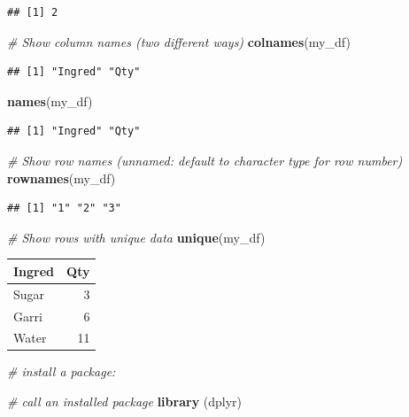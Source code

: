 \documentclass[
]{article}
\newenvironment{Shaded}{\begin{snugshade}}{\end{snugshade}}
\newcommand{\CommentTok}[1]{\textcolor[rgb]{0.56,0.35,0.01}{\textit{#1}}}
\newcommand{\FunctionTok}[1]{\textcolor[rgb]{0.13,0.29,0.53}{\textbf{#1}}}
\newcommand{\NormalTok}[1]{#1}
\begin{document}
\begin{verbatim}
## [1] 2
\end{verbatim}

\begin{Shaded}
\begin{Highlighting}[]
\CommentTok{\# Show column names (two different ways)}
\FunctionTok{colnames}\NormalTok{(my\_df)}
\end{Highlighting}
\end{Shaded}

\begin{verbatim}
## [1] "Ingred" "Qty"
\end{verbatim}

\begin{Shaded}
\begin{Highlighting}[]
\FunctionTok{names}\NormalTok{(my\_df) }
\end{Highlighting}
\end{Shaded}

\begin{verbatim}
## [1] "Ingred" "Qty"
\end{verbatim}

\begin{Shaded}
\begin{Highlighting}[]
\CommentTok{\# Show row names (unnamed: default to character type for row number)}
\FunctionTok{rownames}\NormalTok{(my\_df)}
\end{Highlighting}
\end{Shaded}

\begin{verbatim}
## [1] "1" "2" "3"
\end{verbatim}

\begin{Shaded}
\begin{Highlighting}[]
\CommentTok{\# Show rows with unique data}
\FunctionTok{unique}\NormalTok{(my\_df)}
\end{Highlighting}
\end{Shaded}

\begin{longtable}[]{@{}lr@{}}
\toprule\noalign{}
Ingred & Qty \\
\midrule\noalign{}
\endhead
\bottomrule\noalign{}
\endlastfoot
Sugar & 3 \\
Garri & 6 \\
Water & 11 \\
\end{longtable}

\begin{Shaded}
\begin{Highlighting}[]
\CommentTok{\# install a package:}

\CommentTok{\# call an installed package }
\FunctionTok{library}\NormalTok{ (dplyr)}
\end{Highlighting}
\end{Shaded}
\end{document}
